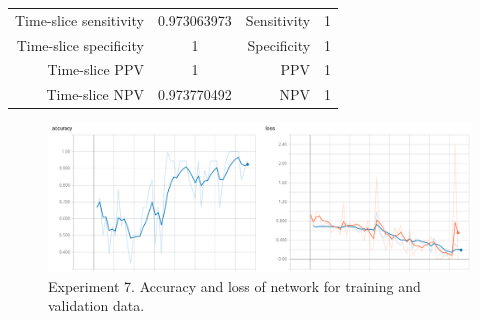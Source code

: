 \documentclass[a4paper,fleqn]{cas-dc}
\begin{document}
\begin{table}
{\begin{tabular}{ | c | c | c | c | c | c | c | c | }
		\multicolumn{2}{|r|}{Time-slice sensitivity} & 
		\multicolumn{2}{c|}{ 0.973063973 } &
		\multicolumn{2}{|r|}{Sensitivity} & 
		\multicolumn{2}{c|}{ 1 } \\ 
		
		\multicolumn{2}{|r|}{Time-slice specificity} & 
		\multicolumn{2}{c|}{ 1 } &
		\multicolumn{2}{|r|}{Specificity} & 
		\multicolumn{2}{c|}{ 1 } \\ 
		
		\multicolumn{2}{|r|}{Time-slice PPV} & 
		\multicolumn{2}{c|}{ 1 } &
		\multicolumn{2}{|r|}{PPV} & 
		\multicolumn{2}{c|}{ 1 } \\ 
		
		\multicolumn{2}{|r|}{Time-slice NPV} & 
		\multicolumn{2}{c|}{ 0.973770492 } &
		\multicolumn{2}{|r|}{NPV} & 
		\multicolumn{2}{c|}{ 1 } \\ \hline
	\end{tabular}
}
\label{table:tests_7}
\end{table}
\begin{figure}
\includegraphics[width=\linewidth]{images/tests_7}
\caption{Experiment 7. Accuracy and loss of network for training and validation data.}
\label{fig:tests_7}
\end{figure}
\end{document}
